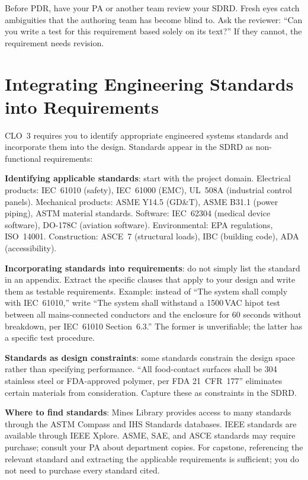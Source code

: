 \begin{tipbox}
Before PDR, have your PA or another team review your SDRD. Fresh eyes catch ambiguities that the authoring team has become blind to. Ask the reviewer: ``Can you write a test for this requirement based solely on its text?'' If they cannot, the requirement needs revision.
\end{tipbox}


\section{Integrating Engineering Standards into Requirements}
CLO~3 requires you to identify appropriate engineered systems standards and incorporate them into the design. Standards appear in the SDRD as non-functional requirements:

\textbf{Identifying applicable standards}: start with the project domain. Electrical products: IEC~61010 (safety), IEC~61000 (EMC), UL~508A (industrial control panels). Mechanical products: ASME Y14.5 (GD\&T), ASME B31.1 (power piping), ASTM material standards. Software: IEC~62304 (medical device software), DO-178C (aviation software). Environmental: EPA regulations, ISO~14001. Construction: ASCE~7 (structural loads), IBC (building code), ADA (accessibility).

\textbf{Incorporating standards into requirements}: do not simply list the standard in an appendix. Extract the specific clauses that apply to your design and write them as testable requirements. Example: instead of ``The system shall comply with IEC~61010,'' write ``The system shall withstand a 1500\,VAC hipot test between all mains-connected conductors and the enclosure for 60 seconds without breakdown, per IEC~61010 Section~6.3.'' The former is unverifiable; the latter has a specific test procedure.

\textbf{Standards as design constraints}: some standards constrain the design space rather than specifying performance. ``All food-contact surfaces shall be 304 stainless steel or FDA-approved polymer, per FDA 21~CFR~177'' eliminates certain materials from consideration. Capture these as constraints in the SDRD.

\textbf{Where to find standards}: Mines Library provides access to many standards through the ASTM Compass and IHS Standards databases. IEEE standards are available through IEEE Xplore. ASME, SAE, and ASCE standards may require purchase; consult your PA about department copies. For capstone, referencing the relevant standard and extracting the applicable requirements is sufficient; you do not need to purchase every standard cited.



